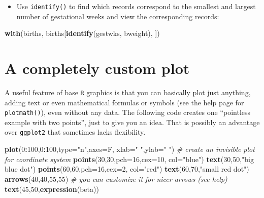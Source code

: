 \documentclass[
]{book}
\newenvironment{Shaded}{\begin{snugshade}}{\end{snugshade}}
\newcommand{\AttributeTok}[1]{\textcolor[rgb]{0.13,0.29,0.53}{#1}}
\newcommand{\CommentTok}[1]{\textcolor[rgb]{0.56,0.35,0.01}{\textit{#1}}}
\newcommand{\DecValTok}[1]{\textcolor[rgb]{0.00,0.00,0.81}{#1}}
\newcommand{\FunctionTok}[1]{\textcolor[rgb]{0.13,0.29,0.53}{\textbf{#1}}}
\newcommand{\NormalTok}[1]{#1}
\newcommand{\SpecialCharTok}[1]{\textcolor[rgb]{0.81,0.36,0.00}{\textbf{#1}}}
\newcommand{\StringTok}[1]{\textcolor[rgb]{0.31,0.60,0.02}{#1}}
\providecommand{\tightlist}{%
  \setlength{\itemsep}{0pt}\setlength{\parskip}{0pt}}
\begin{document}
\begin{itemize}
\tightlist
\item
  Use \texttt{identify()} to find which records correspond to the
  smallest and largest number of gestational weeks and view the
  corresponding records:
\end{itemize}

\begin{Shaded}
\begin{Highlighting}[]
\FunctionTok{with}\NormalTok{(births, births[}\FunctionTok{identify}\NormalTok{(gestwks, bweight), ])}
\end{Highlighting}
\end{Shaded}

\section{A completely custom plot}\label{a-completely-custom-plot}

A useful feature of base \texttt{R} graphics is that you can basically plot just anything, adding text or even mathematical formulas or symbols (see the help page for \texttt{plotmath()}), even without any data. The following code creates one ``pointless example with two points'', just to give you an idea. That is possibly an advantage over \texttt{ggplot2} that sometimes lacks flexibility.

\begin{Shaded}
\begin{Highlighting}[]
\FunctionTok{plot}\NormalTok{(}\DecValTok{0}\SpecialCharTok{:}\DecValTok{100}\NormalTok{,}\DecValTok{0}\SpecialCharTok{:}\DecValTok{100}\NormalTok{,}\AttributeTok{type=}\StringTok{"n"}\NormalTok{,}\AttributeTok{axes=}\NormalTok{F, }\AttributeTok{xlab=}\StringTok{" "}\NormalTok{,}\AttributeTok{ylab=}\StringTok{" "}\NormalTok{) }\CommentTok{\# create an invisible plot for coordinate system}
 \FunctionTok{points}\NormalTok{(}\DecValTok{30}\NormalTok{,}\DecValTok{30}\NormalTok{,}\AttributeTok{pch=}\DecValTok{16}\NormalTok{,}\AttributeTok{cex=}\DecValTok{10}\NormalTok{, }\AttributeTok{col=}\StringTok{"blue"}\NormalTok{)}
 \FunctionTok{text}\NormalTok{(}\DecValTok{30}\NormalTok{,}\DecValTok{50}\NormalTok{,}\StringTok{"big blue dot"}\NormalTok{)}
 \FunctionTok{points}\NormalTok{(}\DecValTok{60}\NormalTok{,}\DecValTok{60}\NormalTok{,}\AttributeTok{pch=}\DecValTok{16}\NormalTok{,}\AttributeTok{cex=}\DecValTok{2}\NormalTok{, }\AttributeTok{col=}\StringTok{"red"}\NormalTok{)}
 \FunctionTok{text}\NormalTok{(}\DecValTok{60}\NormalTok{,}\DecValTok{70}\NormalTok{,}\StringTok{"small red dot"}\NormalTok{)}
 \FunctionTok{arrows}\NormalTok{(}\DecValTok{40}\NormalTok{,}\DecValTok{40}\NormalTok{,}\DecValTok{55}\NormalTok{,}\DecValTok{55}\NormalTok{) }\CommentTok{\# you can customize it for nicer arrows (see help)}
 \FunctionTok{text}\NormalTok{(}\DecValTok{45}\NormalTok{,}\DecValTok{50}\NormalTok{,}\FunctionTok{expression}\NormalTok{(beta)) }
\end{Highlighting}
\end{Shaded}
\end{document}
